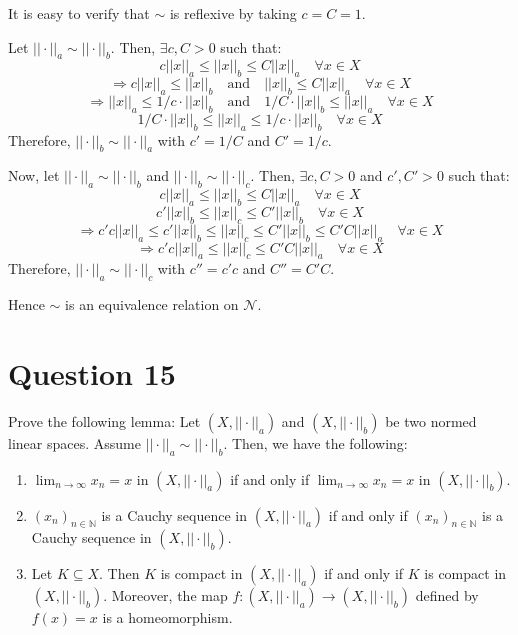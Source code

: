 \documentclass{article}
\begin{document}
	It is easy to verify that $\sim$ is reflexive by taking $c = C = 1$.

	Let $||\cdot||_a \sim ||\cdot||_b$.
	Then, $\exists c, C > 0$ such that:
	\[ c ||x||_a \le ||x||_b \le C ||x||_a \quad \forall x \in X \]
	\[
		\Rightarrow c ||x||_a \le ||x||_b
		\quad \text{and} \quad
		||x||_b \le C ||x||_a \quad \forall x \in X
	\]
	\[
		\Rightarrow ||x||_a \le 1/c \cdot ||x||_b
		\quad \text{and} \quad
		1/C \cdot ||x||_b \le ||x||_a \quad \forall x \in X
	\]
	\[ 1/C \cdot ||x||_b \le ||x||_a \le 1/c \cdot ||x||_b \quad \forall x \in X \]
	Therefore, $||\cdot||_b \sim ||\cdot||_a$ with $c' = 1/C$ and $C' = 1/c$.

	Now, let $||\cdot||_a \sim ||\cdot||_b$ and $||\cdot||_b \sim ||\cdot||_c$.
	Then, $\exists c, C > 0$ and $c', C' > 0$ such that:
	\[ c ||x||_a \le ||x||_b \le C ||x||_a \quad \forall x \in X \]
	\[ c' ||x||_b \le ||x||_c \le C' ||x||_b \quad \forall x \in X \]
	\[
		\Rightarrow c' c ||x||_a \le c' ||x||_b \le ||x||_c
		\le C'||x||_b \le C' C ||x||_a \quad \forall x \in X
	\]
	\[
		\Rightarrow c' c ||x||_a \le ||x||_c
		\le C' C ||x||_a \quad \forall x \in X
	\]
	Therefore, $||\cdot||_a \sim ||\cdot||_c$ with $c'' = c' c$ and $C'' = C' C$.

	Hence $\sim$ is an equivalence relation on $\mathcal{N}$.

\section{Question 15}

	Prove the following lemma: Let $(X, ||\cdot||_a)$ and $(X, ||\cdot||_b)$ be two normed
	linear spaces.
	Assume $||\cdot||_a \sim ||\cdot||_b$.
	Then, we have the following:

	\begin{enumerate}[label=(\alph*)]
		\item $\lim_{n \to \infty} x_n = x$ in $(X, ||\cdot||_a)$ if and only if
		$\lim_{n \to \infty} x_n = x$ in $(X, ||\cdot||_b)$.
		\item $(x_n)_{n \in \mathbb{N}}$ is a Cauchy sequence in $(X, ||\cdot||_a)$ if and only if
		$(x_n)_{n \in \mathbb{N}}$ is a Cauchy sequence in $(X, ||\cdot||_b)$.
		\item Let $K \subseteq X$. Then $K$ is compact in $(X, ||\cdot||_a)$ if and only if
		$K$ is compact in $(X, ||\cdot||_b)$.
		Moreover, the map $f: (X, ||\cdot||_a) \to (X, ||\cdot||_b)$ defined by $f(x) = x$ is a
		homeomorphism.
	\end{enumerate}
\end{document}
